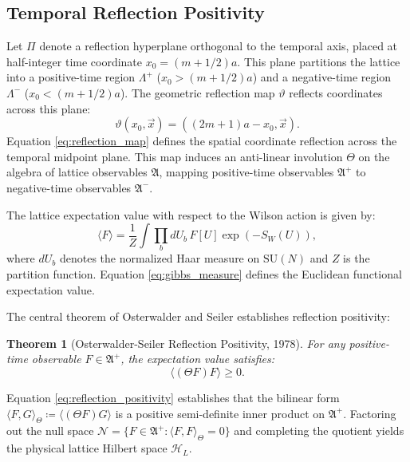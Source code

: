 \documentclass[11pt,reqno]{amsart}
\theoremstyle{plain}
\newtheorem{theorem}{Theorem}[section]
\theoremstyle{definition}
\theoremstyle{remark}
\numberwithin{equation}{section}
\begin{document}
\subsection{Temporal Reflection Positivity}
Let $\Pi$ denote a reflection hyperplane orthogonal to the temporal axis, placed at half-integer time coordinate $x_0 = (m + 1/2)a$. This plane partitions the lattice into a positive-time region $\Lambda^+$ ($x_0 > (m + 1/2)a$) and a negative-time region $\Lambda^-$ ($x_0 < (m + 1/2)a$). The geometric reflection map $\vartheta$ reflects coordinates across this plane:
\begin{equation}
\label{eq:reflection_map}
\vartheta(x_0, \vec{x}) = ((2m + 1)a - x_0, \vec{x}).
\end{equation}
Equation \eqref{eq:reflection_map} defines the spatial coordinate reflection across the temporal midpoint plane. This map induces an anti-linear involution $\Theta$ on the algebra of lattice observables $\mathfrak{A}$, mapping positive-time observables $\mathfrak{A}^+$ to negative-time observables $\mathfrak{A}^-$.

The lattice expectation value with respect to the Wilson action is given by:
\begin{equation}
\label{eq:gibbs_measure}
\langle F \rangle = \frac{1}{Z} \int \prod_{b} dU_b \, F[U] \exp(-S_W(U)),
\end{equation}
where $dU_b$ denotes the normalized Haar measure on $\mathrm{SU}(N)$ and $Z$ is the partition function. Equation \eqref{eq:gibbs_measure} defines the Euclidean functional expectation value.

The central theorem of Osterwalder and Seiler establishes reflection positivity:
\begin{theorem}[Osterwalder-Seiler Reflection Positivity, 1978]
For any positive-time observable $F \in \mathfrak{A}^+$, the expectation value satisfies:
\begin{equation}
\label{eq:reflection_positivity}
\langle (\Theta F) F \rangle \ge 0.
\end{equation}
\end{theorem}
Equation \eqref{eq:reflection_positivity} establishes that the bilinear form $\langle F, G \rangle_\Theta \coloneqq \langle (\Theta F) G \rangle$ is a positive semi-definite inner product on $\mathfrak{A}^+$. Factoring out the null space $\mathcal{N} = \{ F \in \mathfrak{A}^+ : \langle F, F \rangle_\Theta = 0 \}$ and completing the quotient yields the physical lattice Hilbert space $\mathcal{H}_L$.
\end{document}

